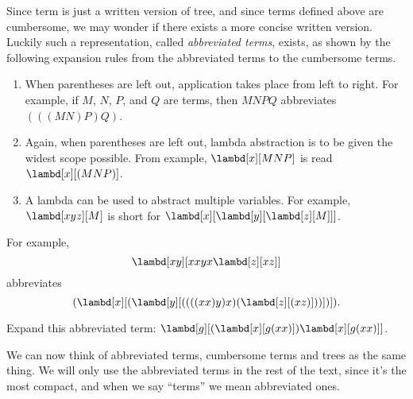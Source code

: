 \documentclass[../../../include/open-logic-section]{subfiles}
\begin{document}
Since term is just a written version of tree, and since terms defined
above are cumbersome, we may wonder if
there exists a more concise written version. Luckily such a
representation, called \emph{abbreviated terms},  exists, as shown by
the following expansion rules from the
abbreviated terms to the cumbersome terms.

\begin{enumerate}
\item When parentheses are left out, application takes place from left
  to right. For example, if $M$, $N$, $P$, and $Q$ are terms, then
  $MNPQ$ abbreviates $(((MN)P)Q)$.
\item Again, when parentheses are left out, lambda abstraction is to
  be given the widest scope possible. From example, $\lambd[x][MNP]$ is
  read $\lambd[x][(MNP)]$.
\item A lambda can be used to abstract multiple variables. For
  example, $\lambd[xyz][M]$ is short for
  $\lambd[x][\lambd[y][\lambd[z][M]]]$.
\end{enumerate}

For example,
\[
\lambd[xy][xxyx \lambd[z][xz]]
\]
abbreviates
\[
(\lambd[x][(\lambd[y][((((xx)y)x)(\lambd[z][(xz)]))])]).
\]

\begin{prob}
  Expand this abbreviated term: $\lambd[g][(\lambd[x][g (x x)]) \lambd[x][g (x x)]]$.
\end{prob}

We can now think of abbreviated terms, cumbersome terms and trees as the same
thing. We will only use the abbreviated terms in the rest of the
text, since it's the most compact, and when we say ``terms'' we mean
abbreviated ones.
\end{document}
